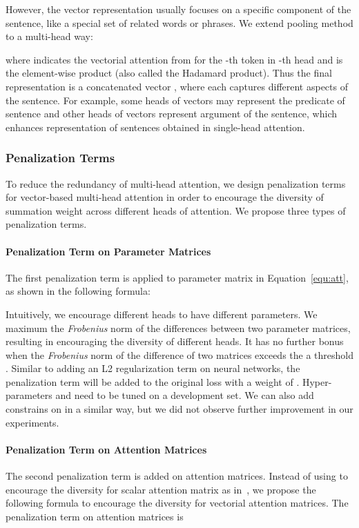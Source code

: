 \documentclass[11pt]{article}
\begin{document}
However, the vector representation usually focuses on a specific component of the sentence, like a special set of related words or phrases. We extend pooling method to a multi-head way: 



\noindent where  indicates the vectorial attention from  for the -th token in -th head and  is the element-wise product (also called the Hadamard product). Thus the final representation is a concatenated vector , where each  captures different aspects of the sentence. For example, some heads of vectors may represent the predicate of sentence and other heads of vectors represent argument of the sentence, which enhances representation of sentences obtained in single-head attention.

\subsubsection{Penalization Terms}

To reduce the redundancy of multi-head attention, we design penalization terms for vector-based multi-head attention in order to encourage the diversity of summation weight across different heads of attention. We propose three types of penalization terms.

\paragraph{Penalization Term on Parameter Matrices}
The first penalization term is applied to parameter matrix  in Equation~\ref{equ:att}, as shown in the following formula:



Intuitively, we encourage different heads to have different parameters. We maximum the \textit{Frobenius} norm of the differences between two parameter matrices, resulting in encouraging the diversity of different heads.
It has no further bonus when the \textit{Frobenius} norm of the difference of two matrices exceeds the a threshold .
Similar to adding an L2 regularization term on neural networks, the penalization term  will be added to the original loss with a weight of . Hyper-parameters  and  need to be tuned on a development set. We can also add constrains on  in a similar way, but we did not observe further improvement in our experiments. 

\paragraph{Penalization Term on Attention Matrices}
The second penalization term is added on attention matrices. Instead of using  to encourage the diversity for scalar attention matrix as in~, we propose the following formula to encourage the diversity for vectorial attention matrices. The penalization term on attention matrices is 
\end{document}
